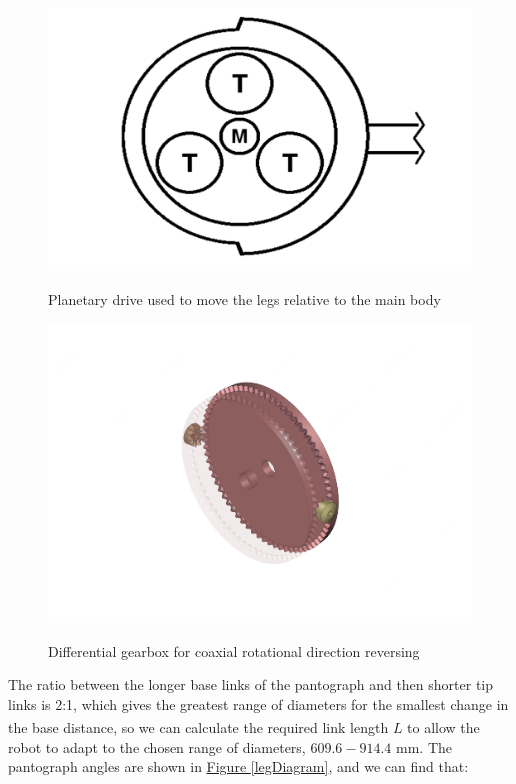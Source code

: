 \documentclass[11pt]{article}		%
\newlength{\imageheight}	 %
\begin{document}
			\begin{figure}[h]
				\centering
				\begin{multicols}{2}
					\includegraphics[height=\imageheight]{planetaryDrive}
					\caption{Planetary drive used to move the legs relative to the main body}
					\label{planetaryDrive}
					\columnbreak
					\includegraphics[height=\imageheight]{diffGearbox}
					\caption{Differential gearbox for coaxial rotational direction reversing}
					\label{diffGearbox}
				\end{multicols}
			\end{figure}
			
			The ratio between the longer base links of the pantograph and then shorter tip links is 2:1, which gives the greatest range of diameters for the smallest change in the base distance\textsuperscript{\cite{okada1987mogrer}}, so we can calculate the required link length $L$ to allow the robot to adapt to the chosen range of diameters, $609.6 - 914.4$ mm.
			The pantograph angles are shown in \hyperref[legDiagram]{Figure \ref*{legDiagram}}, and we can find that:
			
\end{document}
